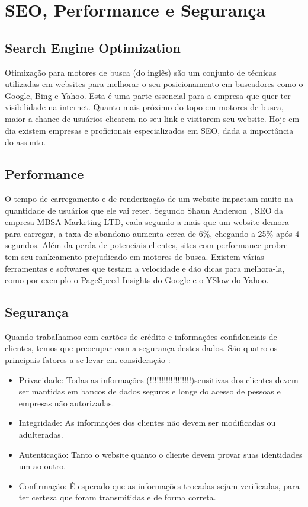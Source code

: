 \section{SEO, Performance e Segurança}

\subsection{Search Engine Optimization}

Otimização para motores de busca (do inglês) são um conjunto de técnicas utilizadas em websites para melhorar o seu posicionamento em buscadores como o Google, Bing e Yahoo. Esta é uma parte essencial para a empresa que quer ter visibilidade na internet. Quanto mais próximo do topo em motores de busca, maior a chance de usuários clicarem no seu link e visitarem seu website. Hoje em dia existem empresas e proficionais especializados em SEO, dada a importância do assunto.

\subsection{Performance}

O tempo de carregamento e de renderização de um website impactam muito na quantidade de usuários que ele vai reter. Segundo Shaun Anderson \cite{LoadTime}, SEO da empresa MBSA Marketing LTD, cada segundo a mais que um website demora para carregar, a taxa de abandono aumenta cerca de 6\%, chegando a 25\% após 4 segundos. Além da perda de potenciais clientes, sites com performance probre tem seu rankeamento prejudicado em motores de busca. Existem várias ferramentas e softwares que testam a velocidade e dão dicas para melhora-la, como por exemplo o PageSpeed Insights do Google e o YSlow do Yahoo.

\subsection{Segurança}

Quando trabalhamos com cartões de crédito e informações confidenciais de clientes, temos que preocupar com a segurança destes dados. São quatro os principais fatores a se levar em consideração \cite{SecurityEcommerce}:

\begin{itemize}
  \item Privacidade: Todas as informações (!!!!!!!!!!!!!!!!!!)sensitivas dos clientes devem ser mantidas em bancos de dados seguros e longe do acesso de pessoas e empresas não autorizadas.
  \item Integridade: As informações dos clientes não devem ser modificadas ou adulteradas.
  \item Autenticação: Tanto o website quanto o cliente devem provar suas identidades um ao outro.
  \item Confirmação: É esperado que as informações trocadas sejam verificadas, para ter certeza que foram transmitidas e de forma correta.
\end{itemize}

